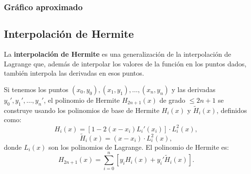 \documentclass[12pt, a4paper]{article}
\theoremstyle{rioplatense}
\begin{document}
\subsubsection*{Gráfico aproximado}
\begin{center}
\end{center}

\subsection{Interpolación de Hermite}

La \textbf{interpolación de Hermite} es una generalización de la interpolación de Lagrange que, además de interpolar los valores de la función en los puntos dados, también interpola las derivadas en esos puntos. 

Si tenemos los puntos \( (x_0, y_0), (x_1, y_1), \dots, (x_n, y_n) \) y las derivadas \( y_0', y_1', \dots, y_n' \), el polinomio de Hermite \( H_{2n+1}(x) \) de grado \( \leq 2n+1 \) se construye usando los polinomios de base de Hermite \( H_i(x) \) y \( \tilde{H}_i(x) \), definidos como:
\[
H_i(x) = [1 - 2(x - x_i)L_i'(x_i)] \cdot L_i^2(x),
\]
\[
\tilde{H}_i(x) = (x - x_i) \cdot L_i^2(x),
\]
donde \( L_i(x) \) son los polinomios de Lagrange. El polinomio de Hermite es:
\[
H_{2n+1}(x) = \sum_{i=0}^n \left[ y_i H_i(x) + y_i' \tilde{H}_i(x) \right].
\]


\end{document}
